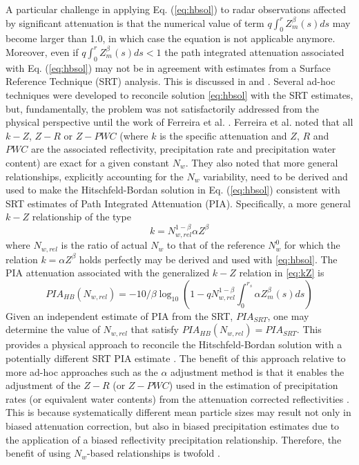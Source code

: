 \documentclass[10pt]{ietbook}
\begin{document}
A particular challenge in applying Eq. (\ref{eq:hbsol}) to radar observations affected by significant attenuation is
that the numerical value of term $q\int_0^r Z_m^\beta(s)ds$ may become larger than 1.0, in which case the equation
is not applicable anymore. Moreover, even if $q\int_0^r Z_m^\beta(s)ds<1$ the path integrated attenuation associated
with Eq. (\ref{eq:hbsol}) may not be in agreement with estimates from a Surface Reference Technique (SRT) analysis.  This
is discussed in \cite{marzoug1991} and \cite{iguchi_meneghini_1994}.  Several ad-hoc techniques were developed to 
reconcile solution \ref{eq:hbsol} with the SRT estimates, but, fundamentally, the problem was not satisfactorily 
addressed from the physical perspective until the work of Ferreira et al. \cite{ferreira2001}. 
Ferreira et al. \cite{ferreira2001} noted that all $k-Z$, $Z-R$ or $Z-PWC$ (where $k$ is the specific attenuation
and $Z$, $R$ and $PWC$ are the associated reflectivity, precipitation rate and precipitation water content) are 
exact for a given constant $N_w$.  They also noted that more general relationships, explicitly accounting for the $N_w$
variability, need to be derived and used to make the Hitschfeld-Bordan 
solution in Eq. (\ref{eq:hbsol}) consistent with SRT estimates of Path Integrated Attenuation (PIA).  Specifically,
a more general $k-Z$ relationship of the type
\begin{equation} \label{eq:kZ}
k=N_{w,rel}^{1-\beta} \alpha Z^{\beta}
\end{equation}
where $N_{w,rel}$ is the ratio of actual $N_w$ to that of the reference $N_{w}^0$ for which the relation $k=\alpha Z^{\beta}$ 
holds perfectly may be derived and used with \ref{eq:hbsol}.  The PIA attenuation associated with the generalized 
$k-Z$ relation in  \ref{eq:kZ} is
\begin{equation} \label{eq:PIA}
PIA_{HB}(N_{w,rel})=-10/\beta \log_{10}(1-q N_{w,rel}^{1-\beta} \int_0^{r_s}\alpha Z_m^\beta(s)ds)
\end{equation}
Given an independent estimate of PIA from the SRT, $PIA_{SRT}$, one may determine the value of $N_{w,rel}$ that satisfy
$PIA_{HB}(N_{w,rel})=PIA_{SRT}$.  This provides a physical approach to reconcile the Hitschfeld-Bordan solution with a potentially
different SRT PIA estimate \cite{ferreira2001}.  The benefit of this approach relative to more ad-hoc approaches such
as the $\alpha$ adjustment method \cite{iguchi_meneghini_1994} is that it enables the adjustment of the $Z-R$ 
(or $Z-PWC$) used in the estimation of precipitation rates (or equivalent water contents) from the attenuation corrected
reflectivities \cite{ferreira2001}. This is because systematically different mean particle sizes may result not only
in biased attenuation correction,  but also in biased precipitation estimates due to the application of a biased reflectivity
precipitation relationship.  Therefore, the benefit of using $N_w$-based relationships is twofold \cite{ferreira2001}.
\end{document}
